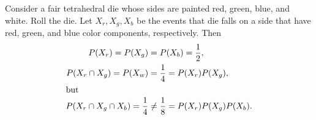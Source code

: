 \documentclass[12pt]{article}
\begin{document}
Consider a fair tetrahedral die whose sides are painted red, green, blue, and white. Roll the die. Let $X_r, X_g, X_b$ be the events that die falls on a side that have red, green, and blue color components, respectively. Then
\begin{align*}
P(X_r)=P(X_g)&=P(X_b)=\frac{1}{2},\\
P(X_r \cap X_g)=P(X_w)&=\frac{1}{4}=P(X_r)P(X_g),\\
\intertext{but}
P(X_r \cap X_g \cap X_b)=\frac{1}{4}&\neq \frac{1}{8}=P(X_r)P(X_g)P(X_b).
\end{align*}
\end{document}
